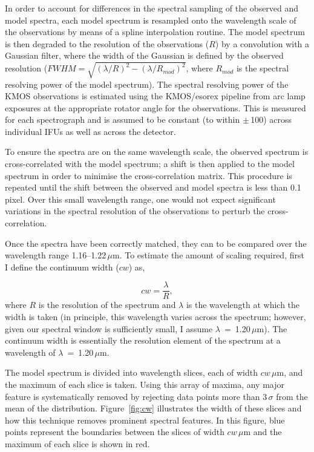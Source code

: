In order to account for differences in the spectral sampling of the observed and model spectra,
each model spectrum is resampled onto the wavelength scale of the observations by means of a spline interpolation routine.
The model spectrum is then degraded to the resolution of the observations
($R$) by a convolution with a Gaussian filter, where the width of the Gaussian is defined by the observed resolution ($FWHM = \sqrt{(\lambda/R)^{2} -(\lambda/R_{mod})^{2}}$, where $R_{mod}$ is the spectral resolving power of the model spectrum).
The spectral resolving power of the KMOS observations is estimated using the KMOS/esorex pipeline from arc lamp exposures at the appropriate rotator angle for the observations.
This is measured for each spectrograph and is assumed to be constant (to within $\pm$\,100) across individual IFUs as well as across the detector.

To ensure the spectra are on the same wavelength scale, the observed spectrum is cross-correlated with the model spectrum;
a shift is then applied to the model spectrum in order to minimise the cross-correlation matrix.
This procedure is repeated until the shift between the observed and model spectra is less than 0.1\,pixel.
Over this small wavelength range, one would not expect significant variations in the spectral resolution of the observations to perturb the cross-correlation.

Once the spectra have been correctly matched, they can to be compared over the wavelength range 1.16--1.22\,$\mu$m.
To estimate the amount of scaling required, first I define the continuum width ($cw$) as,

\begin{equation}
    cw = \frac{\lambda}{R}, %
\end{equation}
where $R$ is the resolution of the spectrum and
$\lambda$ is the wavelength at which the width is taken
(in principle, this wavelength varies across the spectrum; however, given our spectral window is sufficiently small, I assume $\lambda$~=~1.20\,$\mu$m).
The continuum width is essentially the resolution element of the spectrum at a wavelength of
$\lambda$~=~1.20\,$\mu$m.

The model spectrum is divided into wavelength slices, each of width $cw\,\mu$m, and the maximum of each slice is taken.
Using this array of maxima, any major feature is systematically removed by rejecting data points more than 3\,$\sigma$ from the mean of the distribution.
Figure~\ref{fig:cw} illustrates the width of these slices and how this technique removes prominent spectral features.
In this figure, blue points represent the boundaries between the slices of width $cw\,\mu$m and the maximum of each slice is shown in red.


